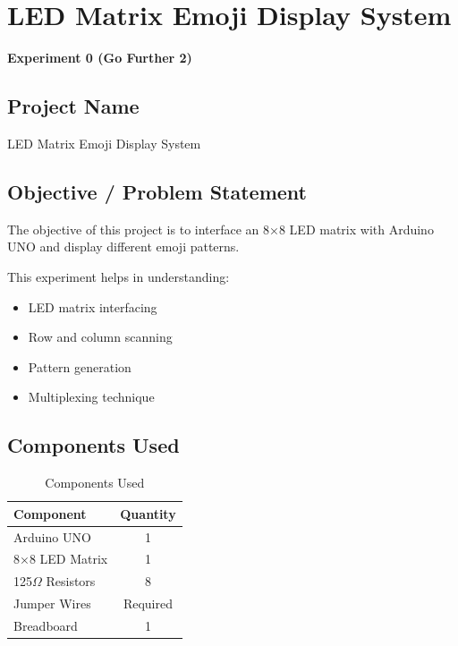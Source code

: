 
\clearpage

\section{LED Matrix Emoji Display System}

\textbf{Experiment 0 (Go Further 2)}


\subsection{Project Name}

LED Matrix Emoji Display System


\subsection{Objective / Problem Statement}

The objective of this project is to interface an 8×8 LED matrix with Arduino UNO and display different emoji patterns.

This experiment helps in understanding:

\begin{itemize}
    \item LED matrix interfacing
    \item Row and column scanning
    \item Pattern generation
    \item Multiplexing technique
\end{itemize}


\subsection{Components Used}

\begin{table}[H]
\centering
\caption{Components Used}
\begin{tabular}{|l|c|}
\hline
\textbf{Component} & \textbf{Quantity} \\
\hline
Arduino UNO & 1 \\
8×8 LED Matrix & 1 \\
125$\Omega$ Resistors & 8 \\
Jumper Wires & Required \\
Breadboard & 1 \\
\hline
\end{tabular}
\end{table}

